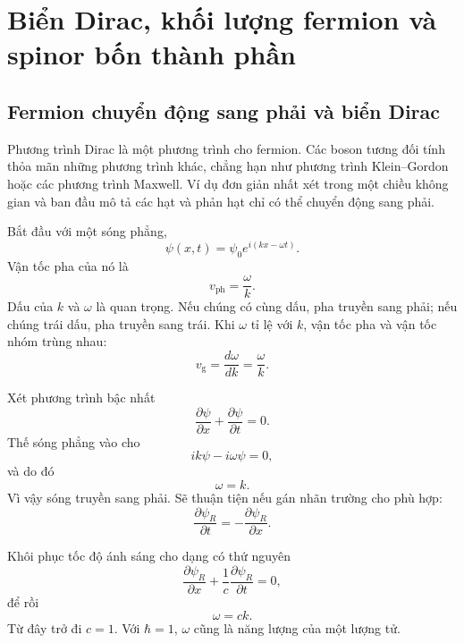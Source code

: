 \chapter{Biển Dirac, khối lượng fermion và spinor bốn thành phần}

\section{Fermion chuyển động sang phải và biển Dirac}

Phương trình Dirac là một phương trình cho fermion. Các boson tương đối tính thỏa mãn những phương trình khác, chẳng hạn như phương trình Klein--Gordon hoặc các phương trình Maxwell. Ví dụ đơn giản nhất xét trong một chiều không gian và ban đầu mô tả các hạt và phản hạt chỉ có thể chuyển động sang phải.

Bắt đầu với một sóng phẳng,
\begin{equation}
\psi(x,t)=\psi_0 e^{i(kx-\omega t)}.
\end{equation}
Vận tốc pha của nó là
\begin{equation}
v_{\mathrm{ph}}=\frac{\omega}{k}.
\end{equation}
Dấu của \(k\) và \(\omega\) là quan trọng. Nếu chúng có cùng dấu, pha truyền sang phải; nếu chúng trái dấu, pha truyền sang trái. Khi \(\omega\) tỉ lệ với \(k\), vận tốc pha và vận tốc nhóm trùng nhau:
\begin{equation}
v_{\mathrm{g}}=\frac{d\omega}{dk}=\frac{\omega}{k}.
\end{equation}

Xét phương trình bậc nhất
\begin{equation}
\frac{\partial\psi}{\partial x}
+
\frac{\partial\psi}{\partial t}
=0.
\end{equation}
Thế sóng phẳng vào cho
\begin{equation}
ik\psi-i\omega\psi=0,
\end{equation}
và do đó
\begin{equation}
\omega=k.
\end{equation}
Vì vậy sóng truyền sang phải. Sẽ thuận tiện nếu gán nhãn trường cho phù hợp:
\begin{equation}
\frac{\partial\psi_R}{\partial t}
=
-\frac{\partial\psi_R}{\partial x}.
\end{equation}

Khôi phục tốc độ ánh sáng cho dạng có thứ nguyên
\begin{equation}
\frac{\partial\psi_R}{\partial x}
+
\frac{1}{c}\frac{\partial\psi_R}{\partial t}
=0,
\end{equation}
để rồi
\begin{equation}
\omega=ck.
\end{equation}
Từ đây trở đi \(c=1\). Với \(\hbar=1\), \(\omega\) cũng là năng lượng của một lượng tử.

